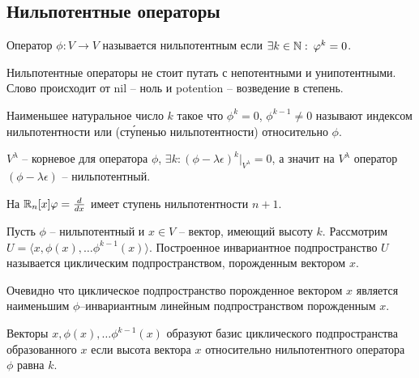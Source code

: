 \subsection{Нильпотентные операторы}  
\begin{definition}
    Оператор $\phi: V \to V$ называется нильпотентным если $\exists k \in \mathbb{N} :\: \varphi^k = 0$.
\end{definition}

\begin{note}
    Нильпотентные операторы не стоит путать с непотентными и унипотентными. Слово происходит от 
    nil -- ноль и potention -- возведение в степень.
\end{note}

\begin{definition}
    Наименьшее натуральное число $k$ такое что $\phi^k = 0$, $\phi^{k-1} \neq 0$ называют 
    индексом нильпотентности или (ст\'{у}пенью нильпотентности) относительно $\phi$. 
\end{definition}

\begin{example}
    $V^{\lambda}$ -- корневое для оператора $\phi$, $\exists k: (\phi - \lambda \epsilon)^k 
    \vert_{V^{\lambda}} = 0$, а значит на $V^{\lambda}$ оператор $(\phi - \lambda \epsilon)$ 
    -- нильпотентный.
\end{example}

\begin{example}
    На $\mathbb{R}_n[x] \varphi = \frac{d}{dx}$ имеет ступень нильпотентности $n+1$.
\end{example}

\begin{definition}
    Пусть $\phi$ -- нильпотентный и $x \in V$ -- вектор, имеющий высоту $k$. 
    Рассмотрим $U = \langle x, \phi(x), \dots \phi^{k-1}(x)\rangle$.
    Построенное инвариантное подпространство $U$ называется циклическим подпространством, 
    порожденным вектором $x$.
\end{definition}

\begin{note}
    Очевидно что циклическое подпространство порожденное вектором $x$ является наименьшим 
    $\phi$--инвариантным линейным подпространством порожденным $x$.
\end{note}

\begin{proposition}
    Векторы $x, \phi(x), \dots \phi^{k-1}(x)$ образуют базис циклического подпространства 
    образованного $x$ если высота вектора $x$ относительно нильпотентного оператора $\phi$ равна $k$.
\end{proposition}

